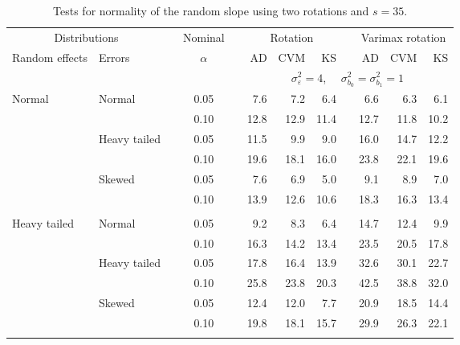 \begin{table}[ht]
\caption{\label{tab:simb1s35-alt}Tests for normality of the random slope using two rotations and $s = 35$.}
\begin{scriptsize}
\begin{center}
\begin{tabular}{ll p{.1cm} c p{.1cm} rrr p{.1cm} rrr}
  \hline
  \multicolumn{2}{c}{Distributions}& & Nominal & &  \multicolumn{3}{c}{Rotation} & & \multicolumn{3}{c}{Varimax rotation} \\ \cline{1-2} \cline{6-8} \cline{10-12}   
  Random effects & Errors & & $\alpha$ & & AD & CVM & KS & & AD & CVM & KS \\ 
   \hline
& && && \multicolumn{7}{c}{$\sigma_{\varepsilon}^2 = 4$, \ \ $\sigma_{b_0}^2 = \sigma_{b_1}^2 = 1$} \\ \cline{6-12}
\rowcolor{gray!20}Normal       & Normal       && 0.05 &&   7.6 & 7.2 & 6.4 &   & 6.6 & 6.3 & 6.1 \\ 
\rowcolor{gray!20}             &              && 0.10 &&   12.8 & 12.9 & 11.4 &   & 12.7 & 11.8 & 10.2 \\ 
\rowcolor{gray!20}             & Heavy tailed && 0.05 &&   11.5 & 9.9 & 9.0 &   & 16.0 & 14.7 & 12.2 \\ 
\rowcolor{gray!20}             &              && 0.10 &&   19.6 & 18.1 & 16.0 &   & 23.8 & 22.1 & 19.6 \\ 
\rowcolor{gray!20}             & Skewed       && 0.05 &&   7.6 & 6.9 & 5.0 &   & 9.1 & 8.9 & 7.0 \\ 
\rowcolor{gray!20}             &              && 0.10 &&   13.9 & 12.6 & 10.6 &   & 18.3 & 16.3 & 13.4 \\ 
&&&&&&&&&&&\\
Heavy tailed & Normal       && 0.05 &&   9.2 & 8.3 & 6.4 &   & 14.7 & 12.4 & 9.9 \\ 
             &              && 0.10 &&   16.3 & 14.2 & 13.4 &   & 23.5 & 20.5 & 17.8 \\ 
             & Heavy tailed && 0.05 &&   17.8 & 16.4 & 13.9 &   & 32.6 & 30.1 & 22.7 \\ 
             &              && 0.10 &&   25.8 & 23.8 & 20.3 &   & 42.5 & 38.8 & 32.0 \\ 
             & Skewed       && 0.05 &&   12.4 & 12.0 & 7.7 &   & 20.9 & 18.5 & 14.4 \\ 
             &              && 0.10 &&   19.8 & 18.1 & 15.7 &   & 29.9 & 26.3 & 22.1 \\ 
&&&&&&&&&&&\\

\end{tabular}
\end{center}
\end{scriptsize}
\end{table}
